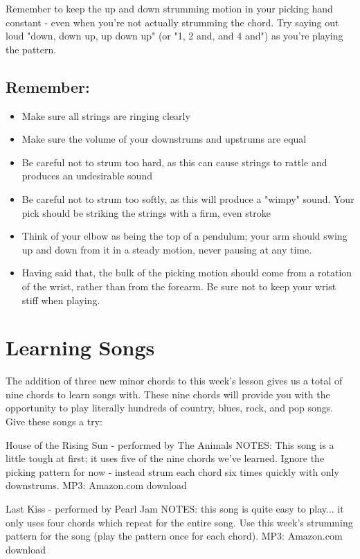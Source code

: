 Remember to keep the up and down strumming motion in your picking hand constant - even when you're not actually strumming the chord. Try saying out loud "down, down up, up down up" (or "1, 2 and, and 4 and") as you're playing the pattern.

\subsection{Remember:}
\begin{itemize}
\item Make sure all strings are ringing clearly
\item Make sure the volume of your downstrums and upstrums are equal
\item Be careful not to strum too hard, as this can cause strings to rattle and produces an undesirable sound
\item Be careful not to strum too softly, as this will produce a "wimpy" sound. Your pick should be striking the strings with a firm, even stroke
\item Think of your elbow as being the top of a pendulum; your arm should swing up and down from it in a steady motion, never pausing at any time.
\item Having said that, the bulk of the picking motion should come from a rotation of the wrist, rather than from the forearm. Be sure not to keep your wrist stiff when playing.
\end{itemize}

\section{Learning Songs}
The addition of three new minor chords to this week's lesson gives us a total of nine chords to learn songs with. These nine chords will provide you with the opportunity to play literally hundreds of country, blues, rock, and pop songs. Give these songs a try:

House of the Rising Sun - performed by The Animals
NOTES: This song is a little tough at first; it uses five of the nine chords we've learned. Ignore the picking pattern for now - instead strum each chord six times quickly with only downstrums.
MP3: Amazon.com download

Last Kiss - performed by Pearl Jam
NOTES: this song is quite easy to play... it only uses four chords which repeat for the entire song. Use this week's strumming pattern for the song (play the pattern once for each chord).
MP3: Amazon.com download

